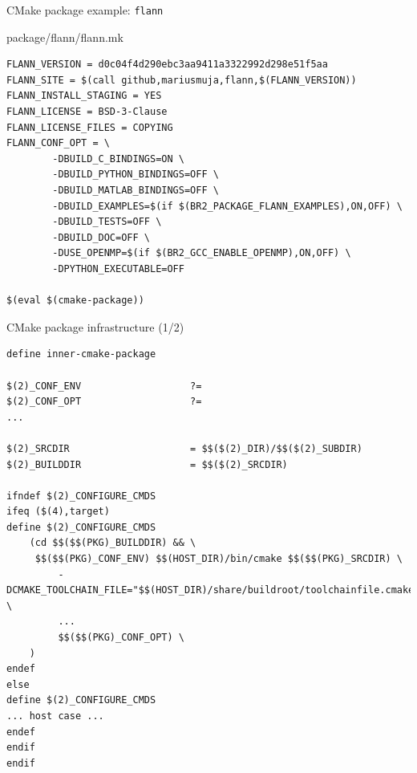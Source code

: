 \begin{frame}[fragile]{CMake package example: {\tt flann}}

\begin{block}{package/flann/flann.mk}
\begin{verbatim}
FLANN_VERSION = d0c04f4d290ebc3aa9411a3322992d298e51f5aa
FLANN_SITE = $(call github,mariusmuja,flann,$(FLANN_VERSION))
FLANN_INSTALL_STAGING = YES
FLANN_LICENSE = BSD-3-Clause
FLANN_LICENSE_FILES = COPYING
FLANN_CONF_OPT = \
        -DBUILD_C_BINDINGS=ON \
        -DBUILD_PYTHON_BINDINGS=OFF \
        -DBUILD_MATLAB_BINDINGS=OFF \
        -DBUILD_EXAMPLES=$(if $(BR2_PACKAGE_FLANN_EXAMPLES),ON,OFF) \
        -DBUILD_TESTS=OFF \
        -DBUILD_DOC=OFF \
        -DUSE_OPENMP=$(if $(BR2_GCC_ENABLE_OPENMP),ON,OFF) \
        -DPYTHON_EXECUTABLE=OFF

$(eval $(cmake-package))
\end{verbatim}
\end{block}

\end{frame}

\begin{frame}[fragile]{CMake package infrastructure (1/2)}

\begin{block}{}
\begin{verbatim}
define inner-cmake-package

$(2)_CONF_ENV                   ?=
$(2)_CONF_OPT                   ?=
...

$(2)_SRCDIR                     = $$($(2)_DIR)/$$($(2)_SUBDIR)
$(2)_BUILDDIR                   = $$($(2)_SRCDIR)

ifndef $(2)_CONFIGURE_CMDS
ifeq ($(4),target)
define $(2)_CONFIGURE_CMDS
    (cd $$($$(PKG)_BUILDDIR) && \
     $$($$(PKG)_CONF_ENV) $$(HOST_DIR)/bin/cmake $$($$(PKG)_SRCDIR) \
         -DCMAKE_TOOLCHAIN_FILE="$$(HOST_DIR)/share/buildroot/toolchainfile.cmake" \
         ...
         $$($$(PKG)_CONF_OPT) \
    )
endef
else
define $(2)_CONFIGURE_CMDS
... host case ...
endef
endif
endif
\end{verbatim}
\end{block}

\end{frame}

